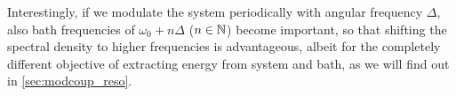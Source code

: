 Interestingly, if we modulate the system periodically with angular
frequency \(Δ\), also bath frequencies of \(ω_{0} + n Δ\)
(\(n\in\mathbb{N}\)) become important, so that shifting the spectral density
to higher frequencies is advantageous, albeit for the completely
different objective of extracting energy from system and bath, as we
will find out in \cref{sec:modcoup_reso}.




